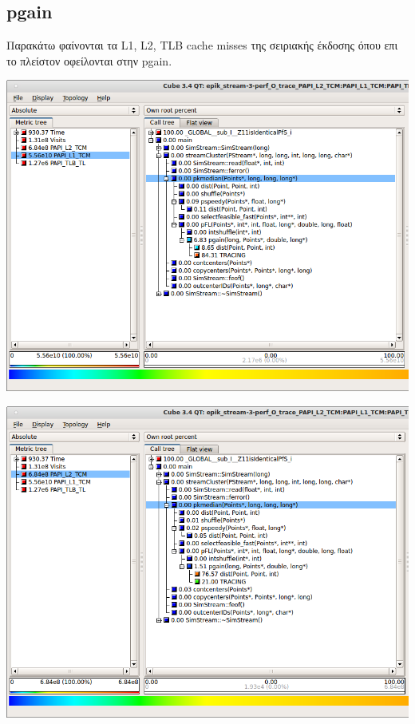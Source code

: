 \documentclass[a4paper,11pt]{article}
\begin{document}
\subsection*{pgain}
Παρακάτω φαίνονται τα L1, L2, TLB cache misses της σειριακής έκδοσης όπου επι το πλείστον οφείλονται στην pgain.
\begin{center}
\includegraphics[width=\textwidth]{../scrshots/l1.png}
\end{center} 
\includegraphics[width=\textwidth]{../scrshots/l2.png}
\end{document}
